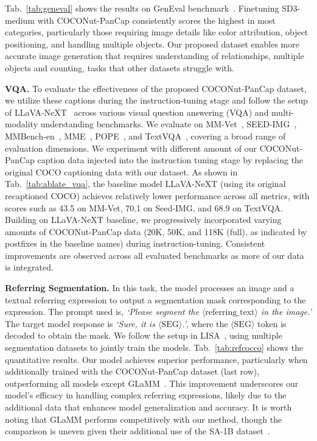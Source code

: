 Tab.~\ref{tab:geneval} shows the results on GenEval benchmark~\cite{ghosh2023geneval}. Finetuning SD3-medium with COCONut-PanCap consistently scores the highest in most categories, particularly those requiring image details like color attribution, object positioning, and handling multiple objects. Our proposed dataset enables more accurate image generation that requires understanding of relationships, multiple objects and counting, tasks that other datasets struggle with.

\noindent\textbf{VQA.} To evaluate the effectiveness of the proposed COCONut-PanCap dataset, we utilize these captions during the instruction-tuning stage and follow the setup of LLaVA-NeXT~\cite{liu2024llavanext} across various visual question answering (VQA) and multi-modality understanding benchmarks. We evaluate on MM-Vet~\cite{yu2024mm-vet}, SEED-IMG~\cite{li2023seed}, MMBench-en~\cite{liu2023mmbench}, MME~\cite{fu2023mme}, POPE~\cite{li2023pope}, and TextVQA~\cite{singh2019textvqa}, covering a broad range of evaluation dimensions. We experiment with different amount of our COCONut-PanCap caption data injected into the instruction tuning stage by replacing the original COCO captioning data with our dataset. As shown in Tab.~\ref{tab:ablate_vqa}, the baseline model LLaVA-NeXT (using its original recaptioned COCO) achieves relatively lower performance across all metrics, with scores such as 43.5 on MM-Vet, 70.1 on Seed-IMG, and 68.9 on TextVQA. 
Building on LLaVA-NeXT baseline, we progressively incorporated varying amounts of COCONut-PanCap data (20K, 50K, and 118K (full), as indicated by postfixes in the baseline names) during instruction-tuning. Consistent improvements are observed across all evaluated benchmarks as more of our data is integrated.


\noindent\textbf{Referring Segmentation.} In this task, the model processes an image and a textual referring expression to output a segmentation mask corresponding to the expression. The prompt used is, \textit{`Please segment the $\langle \mathrm{referring\_text} \rangle$ in the image.'} The target model response is \textit{`Sure, it is  $\langle \mathrm{SEG} \rangle$.'}, where the  $\langle \mathrm{SEG} \rangle$ token is decoded to obtain the mask. We follow the setup in LISA~\cite{lai2024lisa}, using multiple segmentation datasets to jointly train the models. 
Tab.~\ref{tab:refcocco} shows the quantitative results. Our model achieves superior performance, particularly when additionally trained with the COCONut-PanCap dataset (last row), outperforming all models except GLaMM~\cite{hanoona2023GLaMM}. This improvement underscores our model's efficacy in handling complex referring expressions, likely due to the additional data that enhances model generalization and accuracy. It is worth noting that GLaMM performs competitively with our method, though the comparison is uneven given their additional use of the SA-1B dataset~\cite{kirillov2023segmentanything}.

